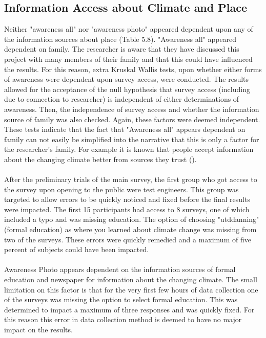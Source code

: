 \subsection{Information Access about Climate and Place}
Neither "awareness all" nor "awareness photo" appeared dependent upon any of the information sources about place  (Table 5.8). "Awareness all" appeared dependent on family. The researcher is aware that they have discussed this project with many members of their family and that this could have influenced the results. For this reason, extra Kruskal Wallis tests, upon whether either forms of awareness were dependent upon survey access, were conducted. The results allowed for the acceptance of the null hypothesis that survey access (including due to connection to researcher) is independent of either determinations of awareness. Then, the independence of survey access and whether the information source of family was also checked. Again, these factors were deemed independent. These tests indicate that the fact that "Awareness all" appears dependent on family can not easily be simplified into the narrative that this is only a factor for the researcher's family. For example it is known that people accept information about the changing climate better from sources they trust (\cite{corner_a_principles_2018}). 
\paragraph{}
After the preliminary trials of the main survey, the first group who got access to the survey upon opening to the public were test engineers. This group was targeted to allow errors to be quickly noticed and fixed before the final results were impacted. The first 15 participants had access to 8 surveys, one of which included a typo and was missing education. The option of choosing "utddanning" (formal education) as where you learned about climate change was missing from two of the surveys. These errors were quickly remedied and a maximum of five percent of subjects could have been impacted. 
\paragraph{}
Awareness Photo appears dependent on the information sources of formal education and newspaper for information about the changing climate. The small limitation on this factor is that for the very first few hours of data collection one of the surveys was missing the option to select formal education. This was determined to impact a maximum of three responses and was quickly fixed. For this reason this error in data collection method is deemed to have no major impact on the results. 
